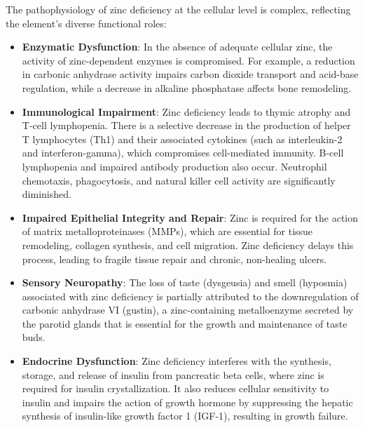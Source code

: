 The pathophysiology of zinc deficiency at the cellular level is complex, reflecting the element's diverse functional roles:
\begin{itemize}
    \item \textbf{Enzymatic Dysfunction}: In the absence of adequate cellular zinc, the activity of zinc-dependent enzymes is compromised. For example, a reduction in carbonic anhydrase activity impairs carbon dioxide transport and acid-base regulation, while a decrease in alkaline phosphatase affects bone remodeling.
    \item \textbf{Immunological Impairment}: Zinc deficiency leads to thymic atrophy and T-cell lymphopenia. There is a selective decrease in the production of helper T lymphocytes (Th1) and their associated cytokines (such as interleukin-2 and interferon-gamma), which compromises cell-mediated immunity. B-cell lymphopenia and impaired antibody production also occur. Neutrophil chemotaxis, phagocytosis, and natural killer cell activity are significantly diminished.
    \item \textbf{Impaired Epithelial Integrity and Repair}: Zinc is required for the action of matrix metalloproteinases (MMPs), which are essential for tissue remodeling, collagen synthesis, and cell migration. Zinc deficiency delays this process, leading to fragile tissue repair and chronic, non-healing ulcers.
    \item \textbf{Sensory Neuropathy}: The loss of taste (dysgeusia) and smell (hyposmia) associated with zinc deficiency is partially attributed to the downregulation of carbonic anhydrase VI (gustin), a zinc-containing metalloenzyme secreted by the parotid glands that is essential for the growth and maintenance of taste buds.
    \item \textbf{Endocrine Dysfunction}: Zinc deficiency interferes with the synthesis, storage, and release of insulin from pancreatic beta cells, where zinc is required for insulin crystallization. It also reduces cellular sensitivity to insulin and impairs the action of growth hormone by suppressing the hepatic synthesis of insulin-like growth factor 1 (IGF-1), resulting in growth failure.
\end{itemize}

